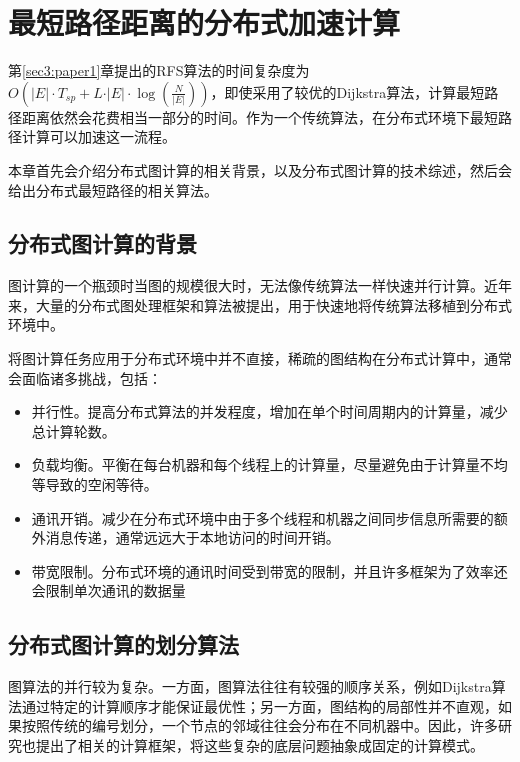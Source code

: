 \chapter{最短路径距离的分布式加速计算}
\label{sec:distribution1}

第\ref{sec3:paper1}章提出的RFS算法的时间复杂度为 $O(\vert E \vert \cdot T_{sp} + L \cdot \vert E \vert \cdot \log(\frac{N}{\vert E \vert}))$，即使采用了较优的Dijkstra算法，计算最短路径距离依然会花费相当一部分的时间。作为一个传统算法，在分布式环境下最短路径计算可以加速这一流程。

本章首先会介绍分布式图计算的相关背景，以及分布式图计算的技术综述，然后会给出分布式最短路径的相关算法。

\section{分布式图计算的背景}
\label{sec:distribution_background}

图计算的一个瓶颈时当图的规模很大时，无法像传统算法一样快速并行计算。近年来，大量的分布式图处理框架和算法被提出，用于快速地将传统算法移植到分布式环境中。

将图计算任务应用于分布式环境中并不直接，稀疏的图结构在分布式计算中，通常会面临诸多挑战，包括：

\begin{itemize}
    \item 并行性。提高分布式算法的并发程度，增加在单个时间周期内的计算量，减少总计算轮数。
    \item 负载均衡。平衡在每台机器和每个线程上的计算量，尽量避免由于计算量不均等导致的空闲等待。
    \item 通讯开销。减少在分布式环境中由于多个线程和机器之间同步信息所需要的额外消息传递，通常远远大于本地访问的时间开销。
    \item 带宽限制。分布式环境的通讯时间受到带宽的限制，并且许多框架为了效率还会限制单次通讯的数据量
\end{itemize}

\section{分布式图计算的划分算法}
\label{sec:distribution_partition}

图算法的并行较为复杂。一方面，图算法往往有较强的顺序关系，例如Dijkstra算法通过特定的计算顺序才能保证最优性；另一方面，图结构的局部性并不直观，如果按照传统的编号划分，一个节点的邻域往往会分布在不同机器中。因此，许多研究也提出了相关的计算框架，将这些复杂的底层问题抽象成固定的计算模式。

